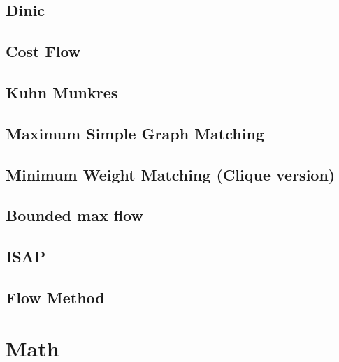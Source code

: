 \documentclass[a4paper,10pt,twocolumn,oneside]{article}
\begin{document}
\subsection{Dinic} %


\subsection{Cost Flow} %


\subsection{Kuhn Munkres}


\subsection{Maximum Simple Graph Matching}


\subsection{Minimum Weight Matching (Clique version)}


% 

\subsection{Bounded max flow}


\subsection{ISAP}


\subsection{Flow Method}


\section{Math}
\end{document}

